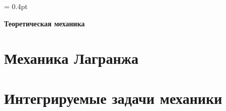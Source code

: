 \documentclass[12pt, a4paper]{article}
\begin{document}
\renewcommand{\cftsecaftersnum}{.}
\renewcommand{\cftsubsecaftersnum}{.}

\renewcommand\refname{Список литературы}

\theoremstyle{plain}
\newtheorem{thm}{Теорема}[section]
\newtheorem{lem}[thm]{Лемма}
\newtheorem{pst}{Постулат}[section]

\theoremstyle{definition}
\newtheorem{dfn}{Определение}[section]
\newtheorem{cns}[thm]{Следствие}

\theoremstyle{remark}
\newtheorem{task}{Задача}[section]
\newtheorem{ex}{Пример}[subsection]
\newtheorem{cex}[ex]{Контрпример}
\newtheorem{rmk}{Замечание}[subsection]

\newcommand*{\eqdef}{\stackrel{\mathrm{def}}{=}}
\newcommand*{\is}[1]{\stackrel{\mathrm{\eqref{#1}}}{=}}
\newcommand*{\eqq}[1]{\stackrel{\mathrm{#1}}{=}}
\newcommand*{\hlf}{\frac{1}{2}}

\columnseprule = 0.4pt


\begin{center}
\Huge{\textbf{Теоретическая механика}}
\end{center}
\tableofcontents
\newpage

\section{Механика Лагранжа}

\newpage



\section{Интегрируемые задачи механики}




\end{document}
